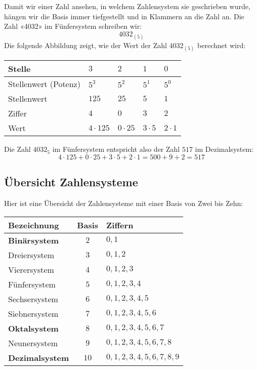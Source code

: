 Damit wir einer Zahl ansehen, in welchem Zahlensystem sie geschrieben wurde, hängen wir die Basis immer tiefgestellt und in Klammern an die Zahl an. Die Zahl «4032» im Fünfersystem schreiben wir:
\[
  4032_{(5)}
\]
Die folgende Abbildung zeigt, wie der Wert der Zahl $4032_{(5)}$ berechnet wird:
\begin{center}
  \begin{tabularx}{0.9\textwidth}{lCCCC}
  \toprule
    Stelle & $3$ & $2$ & $1$ & $0$ \\
  \midrule
    Stellenwert (Potenz) & $5^{3}$ & $5^{2}$ & $5^{1}$ & $5^{0}$ \\
  \midrule
    Stellenwert & $125$ & $25$ & $5$ & $1$ \\
  \midrule
    Ziffer & $4$ & $0$ & $3$ & $2$ \\
  \midrule
    Wert & $4\cdot 125$ & $0\cdot 25$ & $3\cdot 5$ & $2\cdot 1$ \\
  \bottomrule
  \end{tabularx}
\end{center}

Die Zahl $4032_5$ im Fünfersystem entspricht also der Zahl $517$ im Dezimalsystem:
\[
  4\cdot 125+0\cdot 25+3\cdot 5+2\cdot 1 = 500+9+2 = 517
\]

\subsection{Übersicht Zahlensysteme}

Hier ist eine Übersicht der Zahlensysteme mit einer Basis von Zwei bis Zehn:
\begin{center}
  \renewcommand{\arraystretch}{1.3}
  \begin{tabularx}{0.7\textwidth}{Xcl}
    \toprule
      \textbf{Bezeichnung}   & \textbf{Basis} & \textbf{Ziffern} \\
    \midrule
      \textbf{Binärsystem}   & $2$     & $0, 1$                      \\
      Dreiersystem           & $3$     & $0, 1, 2$                      \\
      Vierersystem           & $4$     & $0, 1, 2, 3$                   \\
      Fünfersystem           & $5$     & $0, 1, 2, 3, 4$                \\
      Sechsersystem          & $6$     & $0, 1, 2, 3, 4, 5$             \\
      Siebnersystem          & $7$     & $0, 1, 2, 3, 4, 5, 6$          \\
      \textbf{Oktalsystem}   & $8$     & $0, 1, 2, 3, 4, 5, 6, 7$       \\
      Neunersystem           & $9$     & $0, 1, 2, 3, 4, 5, 6, 7, 8$    \\
      \textbf{Dezimalsystem} & $10$    & $0, 1, 2, 3, 4, 5, 6, 7, 8, 9$ \\
    \bottomrule
  \end{tabularx}
\end{center}
